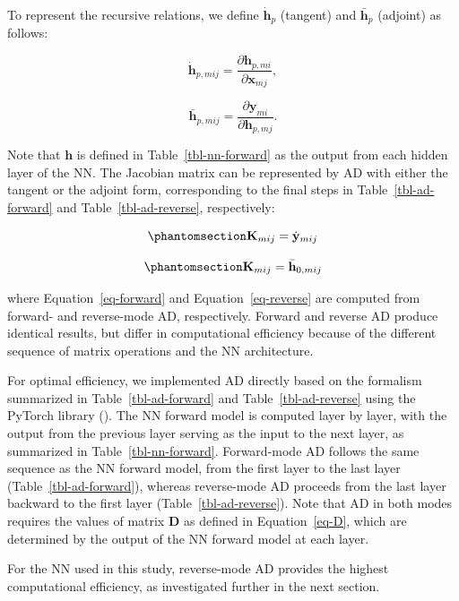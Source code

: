 \documentclass[
  11pt,
  letterpaper,
]{scrreprt}
\begin{document}
To represent the recursive relations, we define \(\dot{\mathbf{h}}_p\)
(tangent) and \(\bar{\mathbf{h}}_p\) (adjoint) as follows:

\[
\dot{\mathbf{h}}_{p,mij}
=
\frac{\partial \mathbf{h}_{p,mi}}
{\partial \mathbf{x}_{mj}},
\]

\[
\bar{\mathbf{h}}_{p,mij}
=
\frac{\partial \mathbf{y}_{mi}}
{\partial \mathbf{h}_{p,mj}}.
\]

Note that \(\mathbf{h}\) is defined in Table~\ref{tbl-nn-forward} as the
output from each hidden layer of the NN. The Jacobian matrix can be
represented by AD with either the tangent or the adjoint form,
corresponding to the final steps in Table~\ref{tbl-ad-forward} and
Table~\ref{tbl-ad-reverse}, respectively:

\begin{equation}\phantomsection\label{eq-forward}{
\mathbf{K}_{mij}
=
\dot{\mathbf{y}}_{mij}
}\end{equation}

\begin{equation}\phantomsection\label{eq-reverse}{
\mathbf{K}_{mij}
=
\bar{\mathbf{h}}_{0,mij}
}\end{equation}

where Equation~\ref{eq-forward} and Equation~\ref{eq-reverse} are
computed from forward- and reverse-mode AD, respectively. Forward and
reverse AD produce identical results, but differ in computational
efficiency because of the different sequence of matrix operations and
the NN architecture.

For optimal efficiency, we implemented AD directly based on the
formalism summarized in Table~\ref{tbl-ad-forward} and
Table~\ref{tbl-ad-reverse} using the PyTorch library
(). The NN forward model
is computed layer by layer, with the output from the previous layer
serving as the input to the next layer, as summarized in
Table~\ref{tbl-nn-forward}. Forward-mode AD follows the same sequence as
the NN forward model, from the first layer to the last layer
(Table~\ref{tbl-ad-forward}), whereas reverse-mode AD proceeds from the
last layer backward to the first layer (Table~\ref{tbl-ad-reverse}).
Note that AD in both modes requires the values of matrix \(\mathbf{D}\)
as defined in Equation~\ref{eq-D}, which are determined by the output of
the NN forward model at each layer.

For the NN used in this study, reverse-mode AD provides the highest
computational efficiency, as investigated further in the next section.
\end{document}
